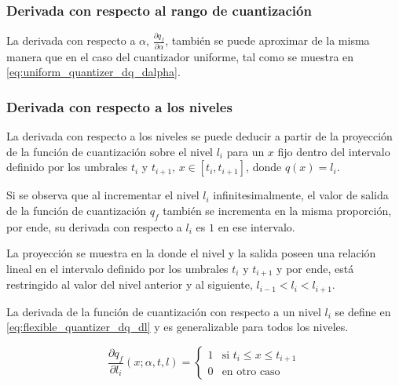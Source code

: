 \vspace{-0.4cm}

\subsubsection{Derivada con respecto al rango de cuantización}
La derivada con respecto a $\alpha$, $\frac{\partial q_f}{\partial \alpha}$, también se puede aproximar de la misma manera que en el caso del cuantizador uniforme, tal como se muestra en \eqref{eq:uniform_quantizer_dq_dalpha}.

\subsubsection{Derivada con respecto a los niveles}
La derivada con respecto a los niveles se puede deducir a partir de la proyección de la función de cuantización sobre el nivel $l_i$ para un $x$ fijo dentro del intervalo definido por los umbrales $t_i$ y $t_{i+1}$, $x \in \left[t_i, t_{i+1}\right]$, donde $q(x) = l_i$.

Si se observa que al incrementar el nivel $l_i$ infinitesimalmente, el valor de salida de la función de cuantización $q_f$ también se incrementa en la misma proporción, por ende, su derivada con respecto a $l_i$ es $1$ en ese intervalo.

La proyección se muestra en la  donde el nivel y la salida poseen una relación lineal en el intervalo definido por los umbrales $t_i$ y $t_{i+1}$ y por ende, está restringido al valor del nivel anterior y al siguiente, $l_{i-1} < l_i < l_{i+1}$.

La derivada de la función de cuantización con respecto a un nivel $l_i$ se define en \eqref{eq:flexible_quantizer_dq_dl} y es generalizable para todos los niveles.


\begin{equation}
\label{eq:flexible_quantizer_dq_dl}
\frac{\partial q_f}{\partial l_i} \left(x; \alpha, t, l\right) =
\begin{cases}
    1 & \text{si } t_i \leq x \leq t_{i+1} \\
    0 & \text{en otro caso}
\end{cases}
\end{equation}

